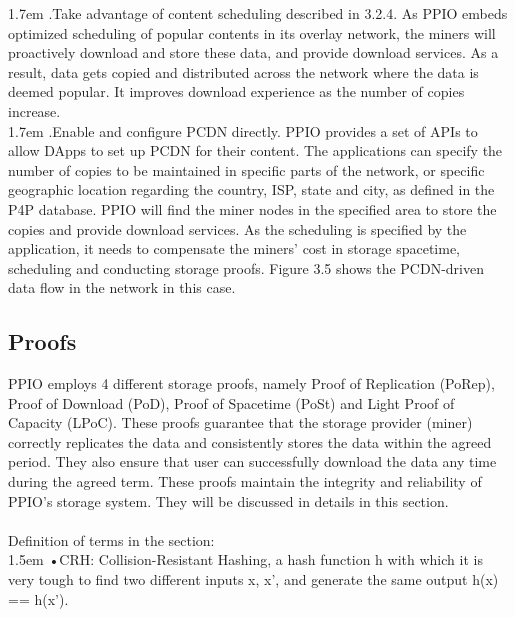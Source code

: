 \documentclass[10pt,a4paper]{article}
\begin{document}
\hangindent 1.7em
.\quad Take advantage of content scheduling described in 3.2.4.  As PPIO embeds optimized scheduling of popular contents in its overlay network,  the miners will proactively download and store these data, and provide download services. As a result, data gets copied and distributed across the network where the data is deemed popular. It improves download experience as the number of copies increase. 
\vspace{-0.7em}
\\

\hangindent 1.7em
.\quad Enable and configure PCDN directly. PPIO provides a set of APIs to allow DApps to set up PCDN for their content. The applications can specify the number of copies to be maintained in specific parts of the network, or specific geographic location regarding the country, ISP, state and city, as defined in the P4P database. PPIO will find the miner nodes in the specified area to store the copies and provide download services. As the scheduling is specified by the application, it needs to compensate the miners’ cost in storage spacetime, scheduling and conducting storage proofs. Figure 3.5 shows the PCDN-driven data flow in the network in this case.
\vspace{-1em}


         \subsection{Proofs}%
PPIO employs 4 different storage proofs, namely Proof of Replication (PoRep), Proof of Download (PoD), Proof of Spacetime (PoSt) and Light Proof of Capacity (LPoC). These proofs guarantee that the storage provider (miner) correctly replicates the data and consistently stores the data within the agreed period. They also ensure that user can successfully download the data any time during the agreed term. These proofs maintain the integrity and reliability of PPIO's storage system. They will be discussed in details in this section.
\vspace{-0.5em}
\\ \\Definition of terms in the section:
\vspace{-0.8em}
\\

\hangindent 1.5em
\noindent   
•\quad CRH: Collision-Resistant Hashing, a hash function h with which it is very tough to find two different inputs x, x', and generate the same output h(x) == h(x').
\vspace{-0.8em}
\\
\end{document}
